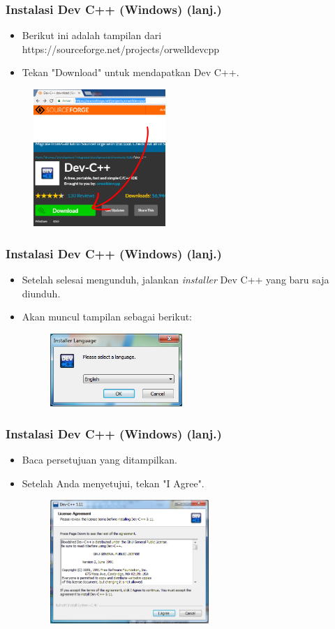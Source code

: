\begin{frame}
\frametitle{Instalasi Dev C++ (Windows) (lanj.)}
\begin{itemize}
  \item Berikut ini adalah tampilan dari https://sourceforge.net/projects/orwelldevcpp
  \item Tekan "Download" untuk mendapatkan Dev C++.
\end{itemize}
\begin{figure}
  \includegraphics[width=5cm]{asset/devcpp-0.png}
\end{figure}
\end{frame}

\begin{frame}
\frametitle{Instalasi Dev C++ (Windows) (lanj.)}
\begin{itemize}
  \item Setelah selesai mengunduh, jalankan \textit{installer} Dev C++ yang baru saja diunduh.
  \item Akan muncul tampilan sebagai berikut:
  \begin{figure}
    \includegraphics[width=5cm]{asset/devcpp-1.png}
  \end{figure}
\end{itemize}
\end{frame}

\begin{frame}
\frametitle{Instalasi Dev C++ (Windows) (lanj.)}
\begin{itemize}
  \item Baca persetujuan yang ditampilkan.
  \item Setelah Anda menyetujui, tekan "I Agree".
  \begin{figure}
    \includegraphics[width=6cm]{asset/devcpp-2.png}
  \end{figure}
\end{itemize}
\end{frame}


